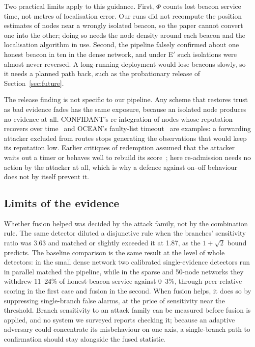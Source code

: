 \documentclass[pdflatex,sn-mathphys-num]{sn-jnl}%
\theoremstyle{thmstyleone}%
\theoremstyle{thmstyletwo}%
\theoremstyle{thmstylethree}%
\begin{document}
Two practical limits apply to this guidance. First, $\Phi$ counts lost
beacon service time, not metres of localisation error. Our runs did not
recompute the position estimates of nodes near a wrongly isolated beacon, so
the paper cannot convert one into the other; doing so needs the node density
around each beacon and the localisation algorithm in use. Second, the
pipeline falsely confirmed about one honest beacon in ten in the dense
network, and under E$'$ such isolations were almost never reversed. A
long-running deployment would lose beacons slowly, so it needs a planned
path back, such as the probationary release of Section~\ref{sec:future}.

The release finding is not specific to our pipeline. Any scheme that
restores trust as bad evidence fades has the same exposure, because an
isolated node produces no evidence at all. CONFIDANT's re-integration of
nodes whose reputation recovers over time~\cite{buchegger2002confidant} and
OCEAN's faulty-list timeout~\cite{bansal2003ocean} are examples: a forwarding
attacker excluded from routes stops generating the observations that would
keep its reputation low. Earlier critiques of redemption assumed that the
attacker waits out a timer or behaves well to rebuild its
score~\cite{sen2010survey,sun2006attacks}; here re-admission needs no action
by the attacker at all, which is why a defence against on--off behaviour
does not by itself prevent it.

\subsection{Limits of the evidence}

Whether fusion helped was decided by the attack family, not by the
combination rule. The same detector diluted a disjunctive rule when the
branches' sensitivity ratio was 3.63 and matched or slightly exceeded it at
1.87, as the $1+\sqrt2$ bound predicts. The baseline comparison is the same
result at the level of whole detectors: in the small dense network two
calibrated single-evidence detectors run in parallel matched the pipeline,
while in the sparse and 50-node networks they withdrew 11--24\% of
honest-beacon service against 0--3\%, through peer-relative scoring in the
first case and fusion in the second. When fusion helps, it does so by
suppressing single-branch false alarms, at the price of sensitivity near the
threshold. Branch sensitivity to an attack family can be measured before
fusion is applied, and no system we surveyed reports checking it; because an
adaptive adversary could concentrate its misbehaviour on one axis, a
single-branch path to confirmation should stay alongside the fused statistic.
\end{document}
